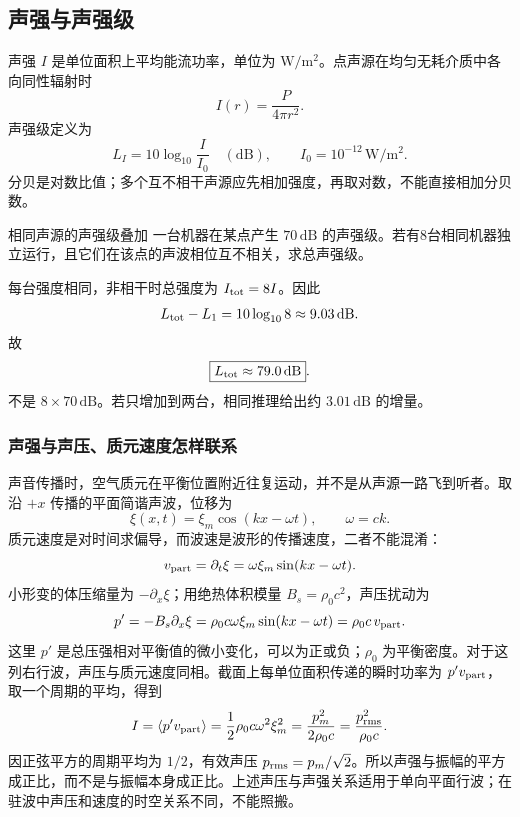 \subsection{声强与声强级}

声强 $I$ 是单位面积上平均能流功率，单位为 $\mathrm{W/m^2}$。点声源在均匀无耗介质中各向同性辐射时
\begin{equation}
 I(r)=\frac{P}{4\pi r^2}.
\end{equation}
声强级定义为
\begin{equation}
 L_I=10\log_{10}\frac I{I_0}\quad(\mathrm{dB}),
 \qquad I_0=10^{-12}\,\mathrm{W/m^2}.
\end{equation}
分贝是对数比值；多个互不相干声源应先相加强度，再取对数，不能直接相加分贝数。




\begin{origexamplebox}{相同声源的声强级叠加}
\label{ch12:ex:05}
一台机器在某点产生 $70\,\mathrm{dB}$ 的声强级。若有8台相同机器独立运行，且它们在该点的声波相位互不相关，求总声强级。

\ThQSoundSources
\end{origexamplebox}
\begin{xesolution}
\ThASoundSources

每台强度相同，非相干时总强度为 $I_{\rm tot}=8I$。因此
\[
 L_{\rm tot}-L_1=10\log_{10}8\approx9.03\,\mathrm{dB}.
\]
故
\[
 \boxed{L_{\rm tot}\approx79.0\,\mathrm{dB}}.
\]
不是 $8\times70\,\mathrm{dB}$。若只增加到两台，相同推理给出约 $3.01\,\mathrm{dB}$ 的增量。
\end{xesolution}

\subsubsection{声强与声压、质元速度怎样联系}
声音传播时，空气质元在平衡位置附近往复运动，并不是从声源一路飞到听者。取沿 $+x$ 传播的平面简谐声波，位移为
\[
 \xi(x,t)=\xi_m\cos(kx-\omega t),\qquad \omega=ck.
\]
质元速度是对时间求偏导，而波速是波形的传播速度，二者不能混淆：
\[
 v_{\rm part}=\partial_t\xi=\omega\xi_m\sin(kx-\omega t).
\]
小形变的体压缩量为 $-\partial_x\xi$；用绝热体积模量 $B_s=\rho_0c^2$，声压扰动为
\[
 p'=-B_s\partial_x\xi
 =\rho_0c\omega\xi_m\sin(kx-\omega t)
 =\rho_0c\,v_{\rm part}.
\]
这里 $p'$ 是总压强相对平衡值的微小变化，可以为正或负；$\rho_0$ 为平衡密度。对于这列右行波，声压与质元速度同相。截面上每单位面积传递的瞬时功率为 $p'v_{\rm part}$，取一个周期的平均，得到
\[
 I=\langle p'v_{\rm part}\rangle
 =\frac12\rho_0c\omega^2\xi_m^2
 =\frac{p_m^2}{2\rho_0c}
 =\frac{p_{\rm rms}^2}{\rho_0c}.
\]
因正弦平方的周期平均为 $1/2$，有效声压 $p_{\rm rms}=p_m/\sqrt2$。所以声强与振幅的平方成正比，而不是与振幅本身成正比。上述声压与声强关系适用于单向平面行波；在驻波中声压和速度的时空关系不同，不能照搬。

